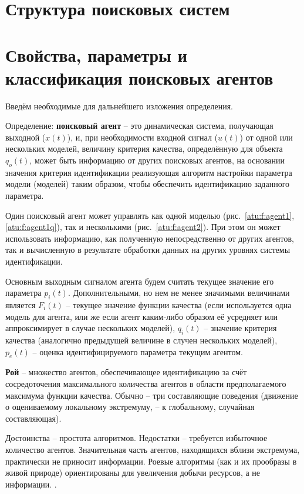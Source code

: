 \section{Структура поисковых систем}

\section{Свойства, параметры и классификация поисковых агентов}

Введём необходимые для дальнейшего изложения определения.

Определение: \textbf{поисковый агент} -- это динамическая система, получающая выходной ($x(t)$),
и, при необходимости входной сигнал ($u(t)$) от одной или нескольких моделей,
величину критерия качества, определённую для объекта $q_o(t)$,
может быть информацию от других поисковых агентов,
на основании значения критерия идентификации
реализующая алгоритм настройки параметра модели (моделей)
таким образом, чтобы обеспечить идентификацию заданного параметра.

Один поисковый агент может управлять как одной моделью (рис.~\ref{atu:f:agent1}, \ref{atu:f:agent1q}),
так и несколькими (рис.~\ref{atu:f:agent2}).
При этом он может использовать информацию,
как полученную непосредственно от других агентов,
так и вычисленную в результате обработки данных на других уровнях системы идентификации.

Основным выходным сигналом агента будем считать текущее
значение его параметра $p_i(t)$. Дополнительными,
но нем не менее значимыми величинами является
$F_i(t)$ -- текущее значение функции качества
(если используется одна  модель для агента, или же если агент каким-либо образом её усредняет
или аппроксимирует в случае нескольких моделей),
$q_i(t)$ -- значение критерия качества (аналогично предыдущей величине в случен нескольких моделей),
$p_e(t)$ -- оценка идентифицируемого параметра текущим агентом.


\textbf{ Рой } -- множество агентов, обеспечивающее идентификацию за счёт
сосредоточения максимального количества агентов
в области предполагаемого максимума функции качества.
Обычно -- три составляющие поведения
(движение о оцениваемому локальному экстремуму, -- к глобальному, случайная составляющая).


Достоинства -- простота алгоритмов.
Недостатки -- требуется избыточное количество агентов.
Значительная часть агентов, находящихся вблизи экстремума,
практически не приносит информации. Роевые
алгоритмы (как и их прообразы в живой природе) ориентированы
для увеличения добычи ресурсов, а не информации. .

